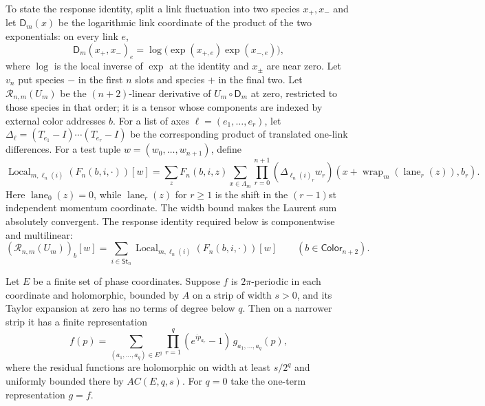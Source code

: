 To state the response identity, split a link fluctuation into two
species $x_+,x_-$ and let $\mathsf D_m(x)$ be the logarithmic link
coordinate of the product of the two exponentials: on every link $e$,
\[
 \mathsf D_m(x_+,x_-)_e=\log\bigl(\exp(x_{+,e})\exp(x_{-,e})\bigr),
\]
where $\log$ is the local inverse of $\exp$ at the identity and
$x_\pm$ are near zero. Let $v_n$ put species $-$ in the first $n$
slots and species $+$ in the final two. Let $\mathcal R_{n,m}(U_m)$ be the $(n+2)$-linear derivative of
$U_m\circ\mathsf D_m$ at zero, restricted to those species in that
order; it is a tensor whose components are indexed by external color
addresses $b$. For a list of axes $\ell=(e_1,\ldots,e_r)$, let
$\Delta_\ell=(T_{e_1}-I)\cdots(T_{e_r}-I)$ be the corresponding product
of translated one-link differences. For a test tuple $w=(w_0,\ldots,w_{n+1})$,
define
\[
 \operatorname{Local}_{m,\ell_n(i)}(F_n(b,i,\cdot))[w]
 =\sum_z F_n(b,i,z)\sum_{x\in\Lambda_m}
   \prod_{r=0}^{n+1}
   (\Delta_{\ell_n(i)_r}w_r)
      (x+\operatorname{wrap}_m(\operatorname{lane}_r(z)),b_r).
\]
Here $\operatorname{lane}_0(z)=0$, while $\operatorname{lane}_r(z)$ for
$r\geq1$ is the shift in the $(r-1)$st independent momentum coordinate.
The width bound makes the Laurent sum absolutely convergent. The response
identity required below is componentwise and multilinear:
\begin{equation}
 (\mathcal R_{n,m}(U_m))_b[w]
   =\sum_{i\in\mathsf{St}_n}
       \operatorname{Local}_{m,\ell_n(i)}(F_n(b,i,\cdot))[w]
       \qquad(b\in\mathsf{Color}_{n+2}).
 \label{eq:soft-curvature-receipts-display-SR2}
\end{equation}
\begin{lemma}
\label{lem:ex-soft-factorization}
Let $E$ be a finite set of phase coordinates. Suppose $f$ is $2\pi$-periodic in each coordinate and holomorphic,
bounded by $A$ on a strip of width $s>0$, and its Taylor expansion at zero
has no terms of degree below $q$. Then on a narrower strip it has a finite
representation
\[
 f(p)=\sum_{(a_1,\ldots,a_q)\in E^q}
        \prod_{r=1}^q(e^{ip_{a_r}}-1)\,g_{a_1,\ldots,a_q}(p),
\]
where the residual functions are holomorphic on width at least
$s/2^q$ and uniformly bounded there by $A C(E,q,s)$. For $q=0$ take the
one-term representation $g=f$.
\end{lemma}


